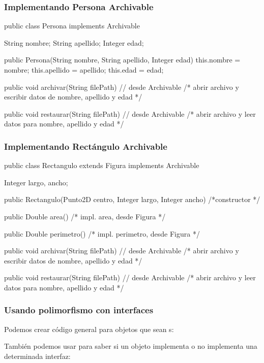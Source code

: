 \documentclass{beamer}
\begin{document}
\begin{frame}[fragile]
  \frametitle{Implementando Persona Archivable}
  \begin{jsmall}
    public class Persona implements Archivable {
      String nombre;
      String apellido;
      Integer edad;

      public Persona(String nombre, String apellido, Integer edad) {
        this.nombre = nombre;
        this.apellido = apellido;
        this.edad = edad;
      }

      public void archivar(String filePath) { // desde Archivable
        /* abrir archivo y escribir datos de nombre, apellido y edad */
      }

      public void restaurar(String filePath) { // desde Archivable
        /* abrir archivo y leer datos para nombre, apellido y edad */
      }
    }    
  \end{jsmall}  
\end{frame}

\begin{frame}[fragile]
  \frametitle{Implementando Rectángulo Archivable}
  \begin{jsmall}
    public class Rectangulo extends Figura implements Archivable {
      Integer largo, ancho;
      
      public Rectangulo(Punto2D centro, Integer largo, Integer ancho) {
        /*constructor */
      }

      public Double area() { /* impl. area, desde Figura */ }
      
      public Double perimetro() { /* impl. perimetro, desde Figura */ }

      public void archivar(String filePath) { // desde Archivable
        /* abrir archivo y escribir datos de nombre, apellido y edad */
      }

      public void restaurar(String filePath) { // desde Archivable
        /* abrir archivo y leer datos para nombre, apellido y edad */
      }       
    }
  \end{jsmall}  
\end{frame}

\begin{frame}
  \frametitle{Usando polimorfismo con interfaces}

  Podemos crear código general para objetos que sean
  s:

  \begin{jsmall}

    
    
    
  \end{jsmall}

  También podemos usar  para saber si un objeto
  implementa o no implementa una determinada interfaz:

  \begin{jsmall}
    
  \end{jsmall}
  
\end{frame}
\end{document}
